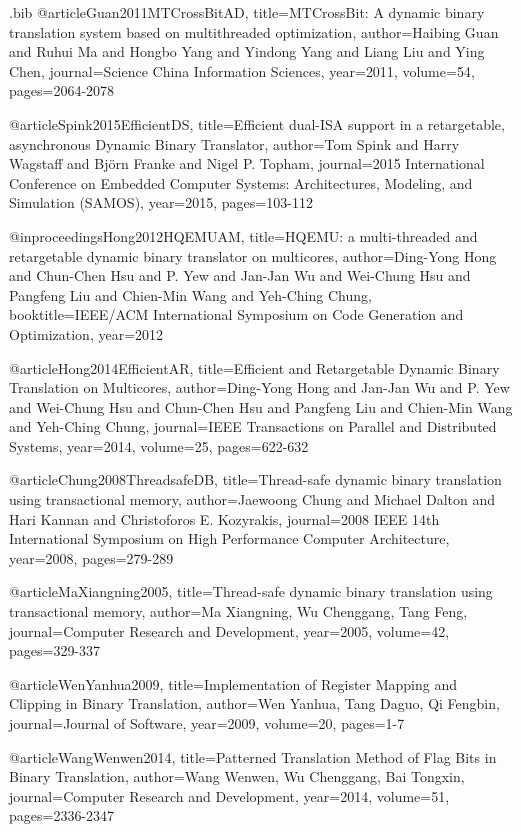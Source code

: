\begin{filecontents}{\jobname.bib}
@article{Guan2011MTCrossBitAD,
  title={MTCrossBit: A dynamic binary translation system based on multithreaded optimization},
  author={Haibing Guan and Ruhui Ma and Hongbo Yang and Yindong Yang and Liang Liu and Ying Chen},
  journal={Science China Information Sciences},
  year={2011},
  volume={54},
  pages={2064-2078}
}

@article{Spink2015EfficientDS,
  title={Efficient dual-ISA support in a retargetable, asynchronous Dynamic Binary Translator},
  author={Tom Spink and Harry Wagstaff and Bj{\"o}rn Franke and Nigel P. Topham},
  journal={2015 International Conference on Embedded Computer Systems: Architectures, Modeling, and Simulation (SAMOS)},
  year={2015},
  pages={103-112}
}

@inproceedings{Hong2012HQEMUAM,
  title={HQEMU: a multi-threaded and retargetable dynamic binary translator on multicores},
  author={Ding-Yong Hong and Chun-Chen Hsu and P. Yew and Jan-Jan Wu and Wei-Chung Hsu and Pangfeng Liu and Chien-Min Wang and Yeh-Ching Chung},
  booktitle={IEEE/ACM International Symposium on Code Generation and Optimization},
  year={2012}
}

@article{Hong2014EfficientAR,
  title={Efficient and Retargetable Dynamic Binary Translation on Multicores},
  author={Ding-Yong Hong and Jan-Jan Wu and P. Yew and Wei-Chung Hsu and Chun-Chen Hsu and Pangfeng Liu and Chien-Min Wang and Yeh-Ching Chung},
  journal={IEEE Transactions on Parallel and Distributed Systems},
  year={2014},
  volume={25},
  pages={622-632}
}

@article{Chung2008ThreadsafeDB,
  title={Thread-safe dynamic binary translation using transactional memory},
  author={Jaewoong Chung and Michael Dalton and Hari Kannan and Christoforos E. Kozyrakis},
  journal={2008 IEEE 14th International Symposium on High Performance Computer Architecture},
  year={2008},
  pages={279-289}
}

@article{MaXiangning2005,
  title={Thread-safe dynamic binary translation using transactional memory},
  author={Ma Xiangning, Wu Chenggang, Tang Feng},
  journal={Computer Research and Development},
  year={2005},
  volume={42},
  pages={329-337}
}

@article{WenYanhua2009,
  title={Implementation of Register Mapping and Clipping in Binary Translation},
  author={Wen Yanhua, Tang Daguo, Qi Fengbin},
  journal={Journal of Software},
  year={2009},
  volume={20},
  pages={1-7}
}

@article{WangWenwen2014,
  title={Patterned Translation Method of Flag Bits in Binary Translation},
  author={Wang Wenwen, Wu Chenggang, Bai Tongxin},
  journal={Computer Research and Development},
  year={2014},
  volume={51},
  pages={2336-2347}
}


\end{filecontents}
